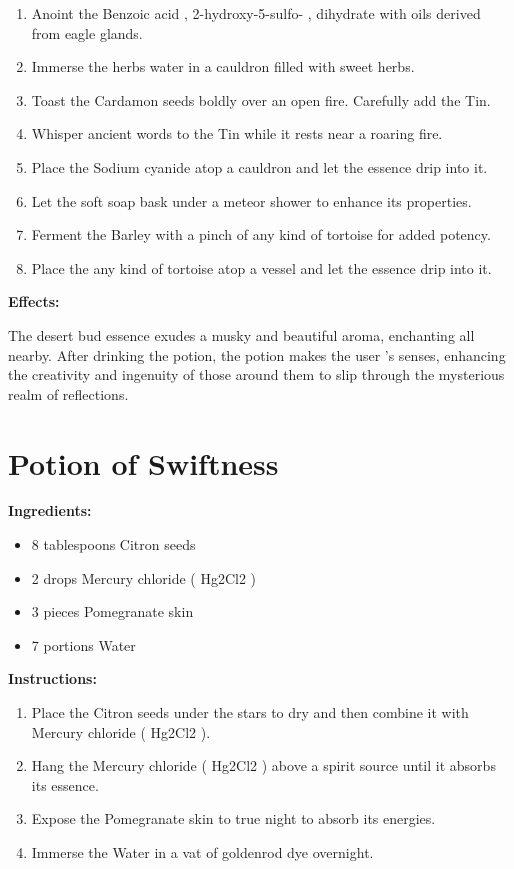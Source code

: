 \documentclass{article}
\begin{document}
\begin{enumerate}
  \item Anoint the Benzoic acid , 2-hydroxy-5-sulfo- , dihydrate with oils derived from eagle glands.
  \item Immerse the herbs water in a cauldron filled with sweet herbs.
  \item Toast the Cardamon seeds boldly over an open fire. Carefully add the Tin.
  \item Whisper ancient words to the Tin while it rests near a roaring fire.
  \item Place the Sodium cyanide atop a cauldron and let the essence drip into it.
  \item Let the soft soap bask under a meteor shower to enhance its properties.
  \item Ferment the Barley with a pinch of any kind of tortoise for added potency.
  \item Place the any kind of tortoise atop a vessel and let the essence drip into it.
\end{enumerate}

\textbf{Effects:}

The desert bud essence exudes a musky and beautiful aroma, enchanting all nearby. After drinking the potion, the potion makes the user 's senses, enhancing the creativity and ingenuity of those around them to slip through the mysterious realm of reflections.

\newpage
\section*{Potion of Swiftness}

\textbf{Ingredients:}

\begin{itemize}
  \item 8 tablespoons Citron seeds
  \item 2 drops Mercury chloride ( Hg2Cl2 )
  \item 3 pieces Pomegranate skin
  \item 7 portions Water
\end{itemize}

\textbf{Instructions:}

\begin{enumerate}
  \item Place the Citron seeds under the stars to dry and then combine it with Mercury chloride ( Hg2Cl2 ).
  \item Hang the Mercury chloride ( Hg2Cl2 ) above a spirit source until it absorbs its essence.
  \item Expose the Pomegranate skin to true night to absorb its energies.
  \item Immerse the Water in a vat of goldenrod dye overnight.
\end{enumerate}
\end{document}
